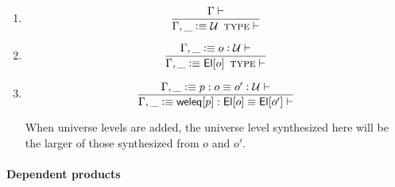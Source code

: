 \documentclass[11pt]{article}
\newcommand{\eqd}{\equiv}
\newcommand{\Eu}{{\cal U}}
\newcommand{\ccheck}[1]{\vcentcolon#1}  %
\newcommand{\synth}[1]{\vcentcolon(\Rightarrow#1)} %
\renewcommand{\synth}[1]{\ccheck#1} %
\newcommand{\Type}{\mathop{\text{ \sc type}}}
\newcommand{\Okay}{\mathop{\text{ \sc okay}}}
\newcommand{\Context}{\vdash\Okay}
\renewcommand{\Context}{\vdash}
\newcommand{\ha}[2]{#1[#2]}
\newcommand{\El}{{\sf El}}
\newcommand{\weleq}{{\sf weleq}}
\newcommand{\var}{\char`_}
\newcommand{\defn}{\vcentcolon\equiv}
\begin{document}
\begin{enumerate}

\item

\[\frac{\Gamma\Context}{\Gamma, \var \defn \Eu \Type \Context }\]

\item

\[\frac{\Gamma, \var \defn o \synth{\Eu} \Context}{\Gamma, \var \defn \ha\El{o}\Type \Context }\]


\item 

\[\frac{\Gamma, \var \defn p : o \eqd o' \synth{\Eu} \Context}
       {\Gamma, \var \defn \ha\weleq{p} : \ha\El{o} \eqd \ha\El{o'} \Context}\]

When universe levels are added, the universe level synthesized here will be the
larger of those synthesized from $o$ and $o'$.

\end{enumerate}

\paragraph{Dependent products}
\end{document}
